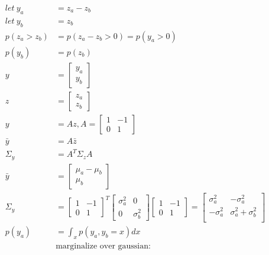 \documentclass{article}
\begin{document}
\begin{enumerate}[label=(\alph*)]
\begin{itemize}
  \begin{align*}
    let\ y_a &= z_a-z_b\\
    let\ y_b &= z_b\\
    p(z_a>z_b) & = p(z_a-z_b>0) = p(y_a>0)\\
    p(y_b) &= p(z_b)\\
    y & =
        \begin{bmatrix}
          y_a\\y_b
        \end{bmatrix}\\
    z & =
        \begin{bmatrix}
          z_a\\z_b
        \end{bmatrix}\\
    y & = Az, A =
        \begin{bmatrix}
          1 & -1\\ 0 & 1
        \end{bmatrix}\\
    \bar{y} &= A\bar{z}\\
    \Sigma_y &= A^T\Sigma_z A\\
    \bar{y} &=
    \begin{bmatrix}
      \mu_a-\mu_b\\
      \mu_b
    \end{bmatrix}\\
    \Sigma_y &=
               \begin{bmatrix}
                 1 & -1\\ 0 & 1
               \end{bmatrix}^T 
    \begin{bmatrix}
      \sigma_a^2 & 0 \\ 0 & \sigma_b^2
    \end{bmatrix}
    \begin{bmatrix}
      1 & -1\\ 0 & 1
    \end{bmatrix} =
                   \begin{bmatrix}
                     \sigma_a^2 & -\sigma_a^2\\
                     -\sigma_a^2 & \sigma_a^2 + \sigma_b^2\\
                   \end{bmatrix}\\
    p(y_a) &= \int_{x} p(y_a,y_b=x) dx\\
             &\text{marginalize over gaussian: }\\

\end{align*}
\end{itemize}
\end{enumerate}
\end{document}
